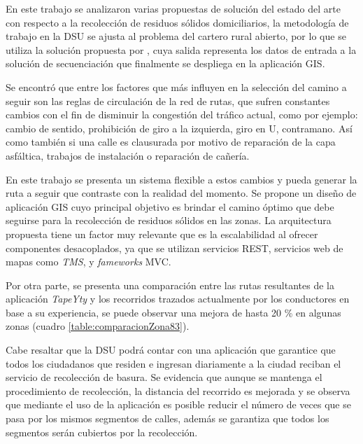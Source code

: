 
En este trabajo se analizaron varias propuestas de solución del estado del arte con respecto a la recolección de residuos sólidos domiciliarios, la metodología de trabajo en la DSU se ajusta al problema del cartero rural abierto, por lo que se utiliza la solución propuesta por \citet{Braier2017AnArgentina}, cuya salida representa los datos de entrada a la solución de secuenciación que finalmente se despliega en la aplicación GIS.

Se encontró que entre los factores que más influyen en la selección del camino a seguir son las reglas de circulación de la red de rutas, que sufren constantes cambios con el fin de disminuir la congestión del tráfico actual, como por ejemplo: cambio de sentido, prohibición de giro a la izquierda, giro en U, contramano. Así como también si una calle es clausurada por motivo de reparación de la capa asfáltica, trabajos de instalación o reparación de cañería.

En este trabajo se presenta un sistema flexible a estos cambios y pueda generar la ruta a seguir que contraste con la realidad del momento. Se propone un diseño de aplicación GIS cuyo principal objetivo es brindar el camino óptimo que debe seguirse para la recolección de residuos sólidos en las zonas. La arquitectura propuesta tiene un factor muy relevante que es la escalabilidad al ofrecer componentes desacoplados, ya que se utilizan servicios REST, servicios web de mapas como \textit{TMS}, y \textit{fameworks} MVC.

Por otra parte, se presenta una comparación entre las rutas resultantes de la aplicación \textit{TapeYty} y los recorridos trazados actualmente por los conductores en base a su experiencia, se puede observar una mejora de hasta 20 \% en algunas zonas (cuadro \ref{table:comparacionZona83}).

Cabe resaltar que la DSU podrá contar con una aplicación que garantice que todos los ciudadanos que residen e ingresan diariamente a la ciudad reciban el servicio de recolección de basura. Se evidencia que aunque se mantenga el procedimiento de recolección, la distancia del recorrido es mejorada y se observa que mediante el uso de la aplicación es posible reducir el número de veces que se pasa por los mismos segmentos de calles, además se garantiza que todos los segmentos serán cubiertos por la recolección.

